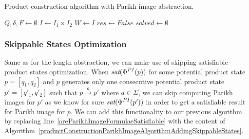 \begin{algorithm}
\caption{Product construction algorithm with Parikh image abstraction.}\label{productConstructionParikhImageAlgorithm}
\DontPrintSemicolon
{}
\BlankLine
$Q, \delta, F \gets \emptyset$ \;
$I \gets I_1 \times I_2$ \;
$W \gets I$ \;
$res \gets False$ \;
$solved \gets \emptyset$ \;\label{PIAlgorithm:solved}
\end{algorithm}

\subsubsection{Skippable States Optimization}

Same as for the length abstraction, we can make use of skipping satisfiable product states optimization. When $\emph{sat}(\emph{$\Phi$}^{PI}(p))$ for some potential product state $p = [q_1, q_2]$ and $p$ generates only one consecutive potential product state $p' = [q'_1, q'_2]$ such that $p \xrightarrow{a} p'$ where $ a \in \Sigma $, we can skip computing Parikh images for $p'$ as we know for sure $\emph{sat}(\emph{$\Phi$}^{PI}(p'))$ in order to get a satisfiable result for Parikh image for $p$. We can add this functionality to our previous algorithm by replacing line~\ref{areParikhImageFormulaeSatisfiable} with the content of Algorithm~\ref{productConstructionParikhImageAlgorithmAddingSkippableStates}.

